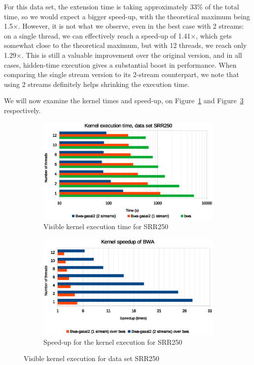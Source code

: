 For this data set, the extension time is taking approximately 33\% of the total time, so we would expect a bigger speed-up, with the theoretical maximum being 1.5$\times$. However, it is not what we observe, even in the best case with 2 streams: on a single thread, we can effectively reach a speed-up of 1.41$\times$, which gets somewhat close to the theoretical maximum, but with 12 threads, we reach only 1.29$\times$. This is still a valuable improvement over the original version, and in all cases, hidden-time execution gives a substantial boost in performance. When comparing the single stream version to its 2-stream counterpart, we note that using 2 streams definitely helps shrinking the execution time.

We will now examine the kernel times and speed-up, on Figure~\ref{fig:kernel-exec-time-srr250} and Figure~\ref{fig:kernel-exec-speed-up-srr250} respectively.


\begin{figure}[p]
	\centering
	\begin{subfigure}[t]{1\textwidth}
		\centering
		\includegraphics[width=1\textwidth]{srr250/kernel-exec-time-srr250}
		\caption{Visible kernel execution time for SRR250}
		\label{fig:kernel-exec-time-srr250}
	\end{subfigure}%
	
	\begin{subfigure}[b]{1\textwidth}
		\centering
		\includegraphics[width=1\textwidth]{srr250/kernel-exec-speed-up-srr250}
		\caption{Speed-up for the kernel execution for SRR250}
		\label{fig:kernel-exec-speed-up-srr250}
	\end{subfigure}
	\caption{Visible kernel execution for data set SRR250}
\end{figure}

